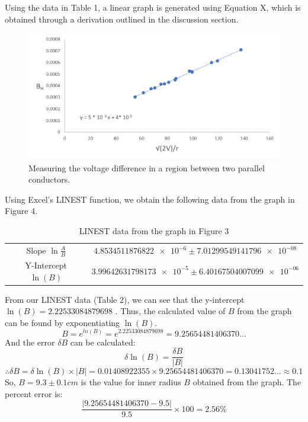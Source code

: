 \documentclass[letterpaper]{article}
\begin{document}
Using the data in Table 1, a linear graph is generated using Equation X,
which is obtained through a derivation outlined in the discussion section.
\begin{figure}[H]
  \centering
  \includegraphics[width=\textwidth]{chart1.png}
  \caption{Measuring the voltage difference in a region between two parallel conductors.}
\end{figure}
\newpage
\noindent Using Excel's LINEST function, we obtain the following data from the graph in Figure 4.
\begin{table}[H]
\centering
\begin{tabular}{cc}
  Slope  $\ln{\frac{A}{B}}$ &  $\num{4.8534511876822e-6}\pm \num{7.01299549141796e-08}$ \\
  Y-Intercept $\ln{(B)}$   &  $\num{3.99642631798173e-5}\pm \num{6.40167504007099e-06}$ \\
\end{tabular}
\caption{LINEST data from the graph in Figure 3}
\end{table}


\noindent From our LINEST data (Table 2), we can see that the y-intercept $\ln{(B)}=2.22533084879698$ .
Thus, the calculated value of $B$ from the graph can be found by exponentiating $\ln{(B)}$.\\
  $$B= e^{ln(B)} = e^{2.22533084879698}=9.25654481406370...$$
And the error $\delta B$ can be calculated:
$$ \delta \ln{(B)} = \frac{\delta B}{|B|}$$
$$ \therefore \delta B = \delta \ln{(B)} \times |B| = 0.01408922355 \times 9.25654481406370 = 0.13041752...\approx 0.1  $$
So, $B=9.3\pm 0.1 cm$ is the value for inner radius $B$ obtained from the graph.
The percent error is:
$$ \frac{|9.25654481406370-9.5|}{9.5}\times100 = 2.56\%$$
\end{document}
